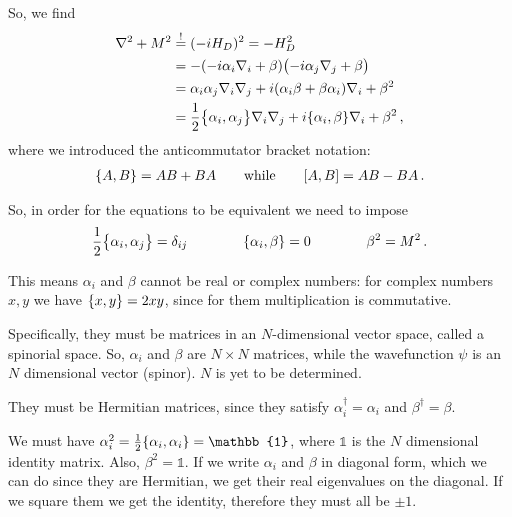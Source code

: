 \documentclass[main.tex]{subfiles}
\begin{document}
So, we find 
%
\begin{align}
\nabla^2 + M^2 &\overset{!}{=} (-i H_D)^2 = - H_D^2  \\
&= -\qty(-i \alpha_{i}  \nabla_{i} + \beta ) \qty(-i \alpha_{j} \nabla_{j} + \beta )  \\
&= \alpha_{i} \alpha_{j} \nabla_{i} \nabla_{j} + i \qty(\alpha_{i} \beta  + \beta \alpha_{i}) \nabla_{i} + \beta^2  \\
&= \frac{1}{2} \qty{\alpha_{i}, \alpha_{j}} \nabla_{i} \nabla_{j} 
+ i \qty{\alpha_{i}, \beta } \nabla_{i} + \beta^2
\,,
\end{align}
%
where we introduced the anticommutator bracket notation: 
%
\begin{align}
\qty{A, B} = AB + BA
\qquad \text{while} \qquad
\qty[A, B] = AB - BA
\,.
\end{align}

So, in order for the equations to be equivalent we need to impose 
%
\begin{align}
\frac{1}{2}\qty{\alpha_{i}, \alpha_{j}} = \delta_{ij}
\qquad \qquad 
\qty{\alpha_{i}, \beta } = 0
\qquad \qquad 
\beta^2 = M^2
\,.
\end{align}

This means \(\alpha_{i}\) and \(\beta \) cannot be real or complex numbers: for complex numbers \(x, y\) we have \(\qty{x, y} = 2 xy \),  since for them multiplication is commutative. 

Specifically, they must be matrices in an \(N\)-dimensional vector space, called a spinorial space. 
So, \(\alpha_{i}\) and \(\beta \) are \(N \times N\) matrices, while the wavefunction \(\psi \) is an \(N\) dimensional vector (spinor). \(N\) is yet to be determined.

They must be Hermitian matrices, since they satisfy \(\alpha_{i} ^\dag = \alpha_{i}\) and \(\beta ^\dag = \beta \).

We must have \(\alpha_{i}^2 = \frac{1}{2} \qty{\alpha_{i}, \alpha_{i}} = \mathbb{1}\), where \(\mathbb{1}\) is the \(N\) dimensional identity matrix. Also, \(\beta^2 = \mathbb{1}\). 
If we write \(\alpha_{i}\) and \(\beta \) in diagonal form, which we can do since they are Hermitian, we get their real eigenvalues on the diagonal. If we square them we get the identity, therefore they must all be \(\pm 1\). 
\end{document}
